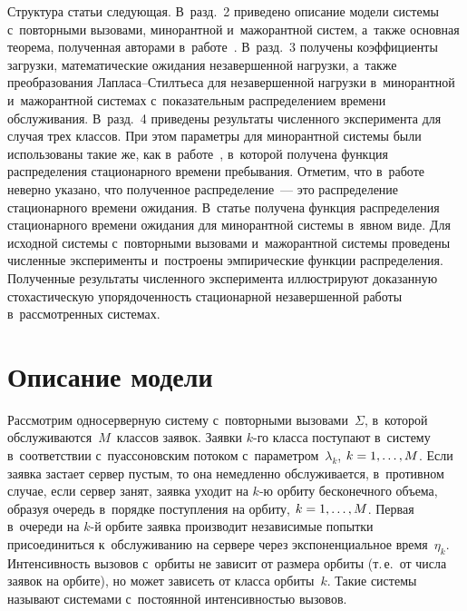 \begin{multicols}{2}
Структура статьи следующая. В~разд.~2 приведено описание модели сис\-те\-мы 
с~повторными вызовами, минорантной и~мажорантной сис\-тем, а~также основная тео\-ре\-ма, 
полученная авторами в~работе~\cite{mathematics2022}.
В~разд.~3 получены коэффициенты загрузки, математические ожидания 
незавершенной нагрузки, а~также преобразования Лап\-ла\-са--Стилть\-еса для 
незавершенной нагрузки в~минорантной и~мажорантной сис\-те\-мах с~показательным 
распределением времени обслуживания. В~разд.~4 приведены результаты численного 
эксперимента для случая трех классов. При этом параметры для минорантной системы 
были использованы такие же, как в~работе~\cite{rego}, в~которой получена  
функция распределения  стационарного времени пребывания. Отметим, что  в~работе~\cite{rego} 
неверно указано, что полученное распределение~--- это распределение 
стационарного времени ожидания. В~статье получена функция распределения  
стационарного времени ожидания для минорантной сис\-те\-мы  в~явном  виде. Для 
исходной сис\-те\-мы с~повторными вызовами и~мажорантной  сис\-те\-мы проведены 
численные эксперименты и~построены эмпирические функции распределения. 
Полученные результаты численного эксперимента иллюстрируют доказанную 
стохастическую упо\-ря\-до\-чен\-ность стационарной незавершенной работы в~рассмотренных 
сис\-те\-мах.

\section{Описание модели}

Рассмотрим односерверную систему с~повторными вызовами~$\Sigma$, в~которой 
обслуживаются~$M$~классов заявок. Заявки $k$-го класса поступают в~сис\-те\-му в~соответствии 
с~пуассоновским потоком с~па\-ра\-мет\-ром~$\lambda_k$, $k\hm=1,\ldots,M$. 
Если заявка застает сервер пустым, то она немедленно обслуживается, в~противном 
случае, если сервер занят,  заявка уходит на $k$-ю орбиту бесконечного объема, 
образуя очередь в~порядке поступления на орбиту, $k\hm=1,\ldots,M$. Первая 
в~очереди на $k$-й орбите заявка производит независимые попытки присоединиться 
к~обслуживанию на сервере через экспоненциальное  время~$\eta_k$.
Интенсивность вызовов с~орбиты не зависит от размера орбиты (т.\,е.\ от числа 
заявок на орбите), но может зависеть от класса орбиты~$k$. Такие сис\-те\-мы 
называют сис\-те\-ма\-ми  с~постоянной ин\-тен\-сив\-ностью вызовов.


\end{multicols}
